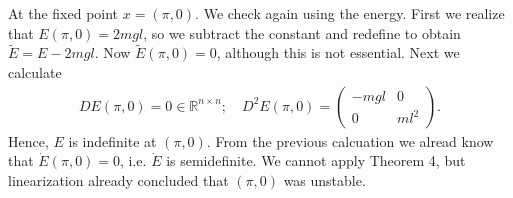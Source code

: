 \begin{ex}
At the fixed point $x = (\pi, 0)$. We check again using the energy. First we realize that $E(\pi, 0)= 2mgl$, so we subtract the constant and redefine to obtain $\tilde{E}= E - 2mgl$. Now $\tilde{E}(\pi, 0) = 0$, although this is not essential. Next we calculate
\begin{align}
	DE(\pi, 0) = 0\in \mathbb{R}^{n\times n};\quad D^2E(\pi, 0) = 
	\begin{pmatrix}
		-mgl & 0 \\
		0 & ml^2
	\end{pmatrix}
	.
\end{align}
Hence, $E$ is indefinite at $(\pi, 0)$. From the previous calcuation we alread know that $\dot{E}(\pi, 0) = 0$, i.e. $\dot{E}$ is semidefinite. We cannot apply Theorem 4, but linearization already concluded that $(\pi,0)$ was unstable.
\end{ex}
